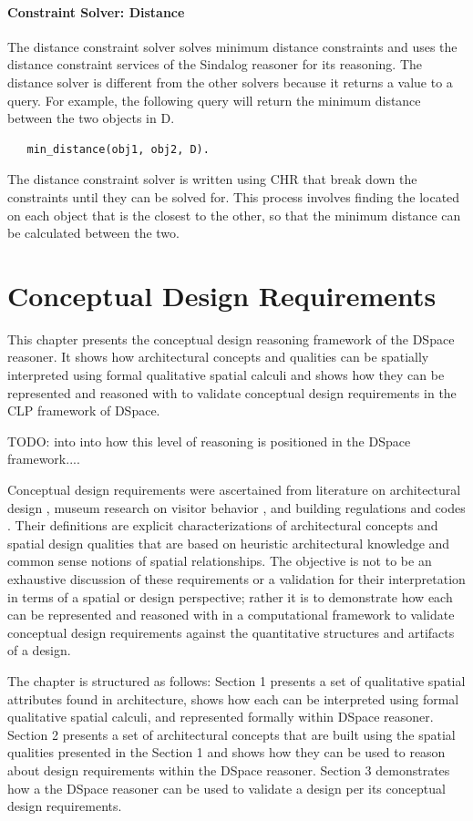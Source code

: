 \documentclass[12pt]{ucthesis}
\begin{document}
\subsubsection{Constraint Solver: Distance}
The distance constraint solver solves minimum distance constraints and uses the distance constraint services of the Sindalog \cite{sindalog} reasoner for its reasoning. The distance solver is different from the other solvers because it returns a value to a query. For example, the following query will return the minimum distance between the two objects in D.
\begin{verbatim}
   min_distance(obj1, obj2, D). 
\end{verbatim}

The distance constraint solver is written using CHR that break down the constraints until they can be solved for. This process involves finding the located on each object that is the closest to the other, so that the minimum distance can be calculated between the two. 


\chapter{Conceptual Design Requirements}
This chapter presents the conceptual design reasoning framework of the DSpace reasoner. It shows how architectural concepts and qualities can be spatially interpreted using formal qualitative spatial calculi and shows how they can be represented and reasoned with to validate conceptual design requirements in the CLP framework of DSpace. 

TODO: into into how this level of reasoning is positioned in the DSpace framework....

Conceptual design requirements were ascertained from literature on architectural design \cite{tbd}, museum research on visitor behavior \cite{tbd}, and building regulations and codes \cite{tbd}. Their definitions are explicit characterizations of architectural concepts and spatial design qualities that are based on heuristic architectural knowledge and common sense notions of spatial relationships. The objective is not to be an exhaustive discussion of these requirements or a validation for their interpretation in terms of a spatial or design perspective; rather it is to demonstrate how each can be represented and reasoned with in a computational framework to validate conceptual design requirements against the quantitative structures and artifacts of a design. 

The chapter is structured as follows: Section 1 presents a set of qualitative spatial attributes found in architecture, shows how each can be interpreted using formal qualitative spatial calculi, and represented formally within DSpace reasoner. Section 2 presents a set of architectural concepts that are built using the spatial qualities presented in the Section 1 and shows how they can be used to reason about design requirements within the DSpace reasoner. Section 3 demonstrates how a the DSpace reasoner can be used to validate a design per its conceptual design requirements.
\end{document}
